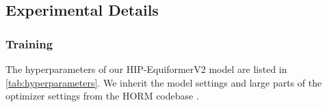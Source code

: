 \documentclass[pdflatex,sn-mathphys-num]{sn-jnl}%
\theoremstyle{thmstyleone}%
\theoremstyle{thmstyletwo}%
\theoremstyle{thmstylethree}%
\begin{document}
\begin{appendices}





\subsection{Experimental Details}

\subsubsection{Training}

The hyperparameters of our HIP-EquiformerV2 model are listed in \ref{tab:hyperparameters}. We inherit the model settings and large parts of the optimizer settings from the HORM codebase \citep{cui2025horm}.


\end{appendices}
\end{document}
